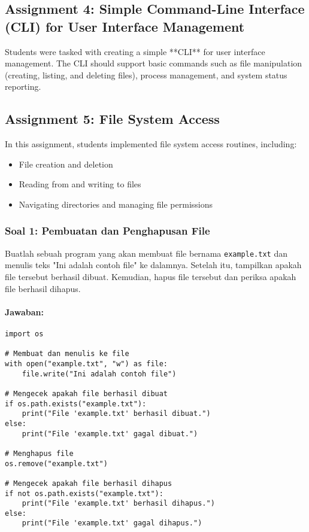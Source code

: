 \documentclass[12pt]{article}
\begin{document}
\subsection{Assignment 4: Simple Command-Line Interface (CLI) for User Interface Management}
Students were tasked with creating a simple **CLI** for user interface management. The CLI should support basic commands such as file manipulation (creating, listing, and deleting files), process management, and system status reporting.

\subsection{Assignment 5: File System Access}
In this assignment, students implemented file system access routines, including:
\begin{itemize}
    \item File creation and deletion
    \item Reading from and writing to files
    \item Navigating directories and managing file permissions
\end{itemize}

\subsubsection{Soal 1: Pembuatan dan Penghapusan File}
Buatlah sebuah program yang akan membuat file bernama \texttt{example.txt} dan menulis teks "Ini adalah contoh file" ke dalamnya. Setelah itu, tampilkan apakah file tersebut berhasil dibuat. Kemudian, hapus file tersebut dan periksa apakah file berhasil dihapus.

\paragraph{Jawaban:}
\begin{verbatim}
import os

# Membuat dan menulis ke file
with open("example.txt", "w") as file:
    file.write("Ini adalah contoh file")

# Mengecek apakah file berhasil dibuat
if os.path.exists("example.txt"):
    print("File 'example.txt' berhasil dibuat.")
else:
    print("File 'example.txt' gagal dibuat.")

# Menghapus file
os.remove("example.txt")

# Mengecek apakah file berhasil dihapus
if not os.path.exists("example.txt"):
    print("File 'example.txt' berhasil dihapus.")
else:
    print("File 'example.txt' gagal dihapus.")
\end{verbatim}
\end{document}
